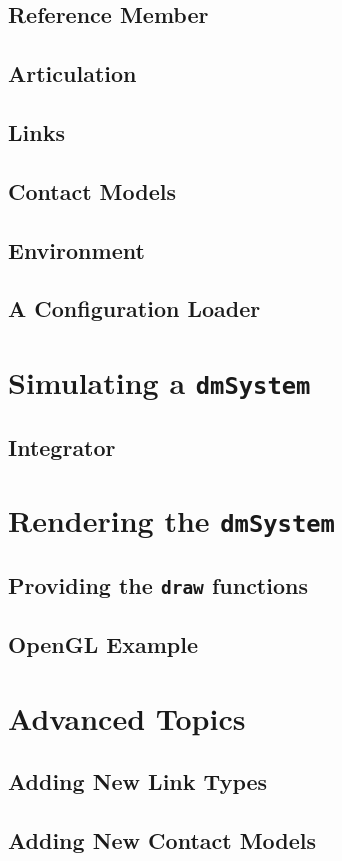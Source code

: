 \documentclass[11pt]{article}
\begin{document}
\subsection{Reference Member}
\subsection{Articulation}
\subsection{Links}
\subsection{Contact Models}
\subsection{Environment}
\subsection{A Configuration Loader}


\section{Simulating a {\tt dmSystem}}
\subsection{Integrator}


\section{Rendering the {\tt dmSystem}}
\subsection{Providing the {\tt draw} functions}
\subsection{OpenGL Example}


\section{Advanced Topics}
\subsection{Adding New Link Types}
\subsection{Adding New Contact Models}



\end{document}
